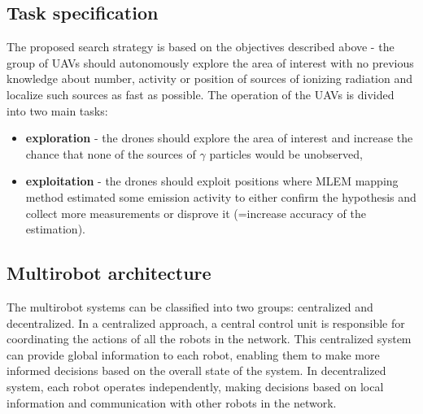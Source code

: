 \subsection{Task specification}
The proposed search strategy is based on the objectives described above - the group of \ac{UAV}s should autonomously explore the area of interest with no previous knowledge about number, activity or position of sources of ionizing radiation and localize such sources as fast as possible.
The operation of the \ac{UAV}s is divided into two main tasks:
\begin{itemize}
  \item \textbf{exploration} - the drones should explore the area of interest and increase the chance that none of the sources of $\gamma$ particles would be unobserved,
  \item \textbf{exploitation} - the drones should exploit positions where \ac{MLEM} mapping method estimated some emission activity to either confirm the hypothesis and collect more measurements or disprove it (=increase accuracy of the estimation).
\end{itemize}


\subsection{Multirobot architecture}
The multirobot systems can be classified into two groups: centralized and decentralized.
In a centralized approach, a central control unit is responsible for coordinating the actions of all the robots in the network. 
This centralized system can provide global information to each robot, enabling them to make more informed decisions based on the overall state of the system.
In decentralized system, each robot operates independently, making decisions based on local information and communication with other robots in the network. 

